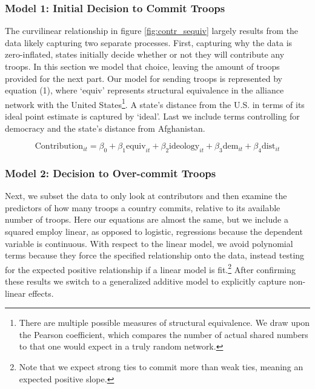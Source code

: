 \documentclass[12pt,letterpaper]{article}
\begin{document}
		\subsubsection{Model 1: Initial Decision to Commit Troops}
			The curvilinear relationship in figure \ref{fig:contr_sequiv} largely results from the data likely capturing two separate processes. First, capturing why the data is zero-inflated, states initially decide whether or not they will contribute any troops. In this section we model that choice, leaving the amount of troops provided for the next part. Our model for sending troops is represented by equation (1), where `equiv' represents structural equivalence in the alliance network with the United States\footnote{There are multiple possible measures of structural equivalence. We draw upon the Pearson coefficient, which compares the number of actual shared numbers to that one would expect in a truly random network.}. A state's distance from the U.S. in terms of its ideal point estimate is captured by `ideal'. \citep{bailey_twodimensionalanalysisseventy_2018} Last we include terms controlling for democracy and the state's distance from Afghanistan.

			\vspace{-2em}
			\begin{equation}
			\text{Contribution}_{it} = \beta_0 + \beta_1\text{equiv}_{it} +  \beta_2\text{ideology}_{it} + \beta_3\text{dem}_{it} + \beta_4\text{dist}_{it}
			\end{equation}
	
		\subsubsection{Model 2: Decision to Over-commit Troops}
			Next, we subset the data to only look at contributors and then examine the predictors of how many troops a country commits, relative to its available number of troops. Here our equations are almost the same, but we include a squared employ linear, as opposed to logistic, regressions because the dependent variable is continuous. With respect to the linear model, we avoid polynomial terms because they force the specified relationship onto the data, instead testing for the expected positive relationship if a linear model is fit.\footnote{Note that we expect strong ties to commit more than weak ties, meaning an expected positive slope.} After confirming these results we switch to a generalized additive model to explicitly capture non-linear effects.
\end{document}
